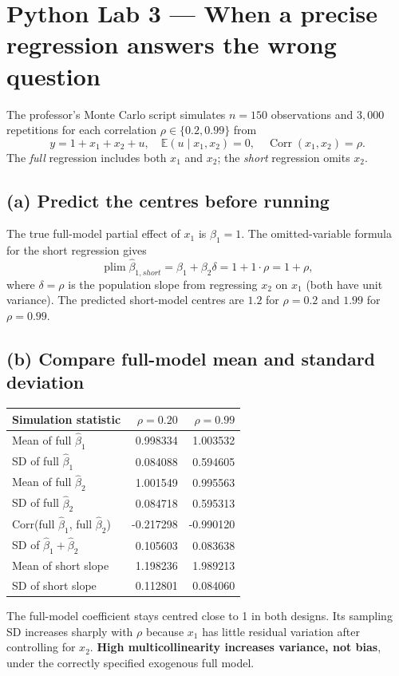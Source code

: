 \documentclass[11pt,a4paper]{article}
\newcommand{\E}{\mathbb{E}}
\begin{document}
\section{Python Lab 3 --- When a precise regression answers the wrong question}
The professor's Monte Carlo script simulates $n=150$ observations and $3{,}000$ repetitions for each correlation $\rho\in\{0.2,0.99\}$ from
\[
y=1+x_1+x_2+u,\quad \E(u\mid x_1,x_2)=0,\quad \operatorname{Corr}(x_1,x_2)=\rho.
\]
The \emph{full} regression includes both $x_1$ and $x_2$; the \emph{short} regression omits $x_2$.
\subsection*{(a) Predict the centres before running}
The true full-model partial effect of $x_1$ is $\beta_1=1$. The omitted-variable formula for the short regression gives
\[
\operatorname{plim}\widehat\beta_{1,short}=\beta_1+\beta_2\delta
=1+1\cdot\rho=\boxed{1+\rho},
\]
where $\delta=\rho$ is the population slope from regressing $x_2$ on $x_1$ (both have unit variance). The predicted short-model centres are $1.2$ for $\rho=0.2$ and $1.99$ for $\rho=0.99$.

\subsection*{(b) Compare full-model mean and standard deviation}
\begin{center}
\begin{tabular}{lrr}
\toprule
Simulation statistic & $\rho=0.20$ & $\rho=0.99$\\
\midrule
Mean of full $\widehat\beta_1$ & 0.998334 & 1.003532\\
SD of full $\widehat\beta_1$ & 0.084088 & 0.594605\\
Mean of full $\widehat\beta_2$ & 1.001549 & 0.995563\\
SD of full $\widehat\beta_2$ & 0.084718 & 0.595313\\
Corr(full $\widehat\beta_1$, full $\widehat\beta_2$) & -0.217298 & -0.990120\\
SD of $\widehat\beta_1+\widehat\beta_2$ & 0.105603 & 0.083638\\
Mean of short slope & 1.198236 & 1.989213\\
SD of short slope & 0.112801 & 0.084060\\
\bottomrule
\end{tabular}
\end{center}
The full-model coefficient stays centred close to 1 in both designs. Its sampling SD increases sharply with $\rho$ because $x_1$ has little residual variation after controlling for $x_2$. \textbf{High multicollinearity increases variance, not bias}, under the correctly specified exogenous full model.
\end{document}
